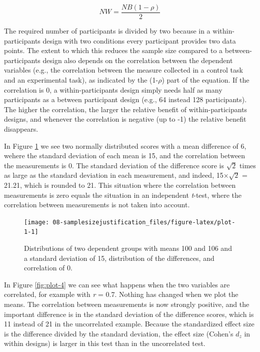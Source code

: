\documentclass[
  oneside]{book}
\begin{document}
\[NW = \frac{NB (1-\rho)}{2}\]

The required number of participants is divided by two because in a within-participants design with two conditions every participant provides two data points. The extent to which this reduces the sample size compared to a between-participants design also depends on the correlation between the dependent variables (e.g., the correlation between the measure collected in a control task and an experimental task), as indicated by the (1-\(\rho\)) part of the equation. If the correlation is 0, a within-participants design simply needs half as many participants as a between participant design (e.g., 64 instead 128 participants). The higher the correlation, the larger the relative benefit of within-participants designs, and whenever the correlation is negative (up to -1) the relative benefit disappears.

In Figure \ref{fig:plot-1} we see two normally distributed scores with a mean difference of 6, wehere the standard deviation of each mean is 15, and the correlation between the measurements is 0. The standard deviation of the difference score is \(\sqrt{2}\) times as large as the standard deviation in each measurement, and indeed, 15×\(\sqrt{2}\) = 21.21, which is rounded to 21. This situation where the correlation between measurements is zero equals the situation in an independent \emph{t}-test, where the correlation between measurements is not taken into account.

\begin{figure}

{\centering \texttt{[image: 08-samplesizejustification\_files/figure-latex/plot-1-1]} 

}

\caption{Distributions of two dependent groups with means 100 and 106 and a standard deviation of 15, distribution of the differences, and correlation of 0.}\label{fig:plot-1}
\end{figure}

In Figure \ref{fig:plot-4} we can see what happens when the two variables are correlated, for example with \emph{r} = 0.7. Nothing has changed when we plot the means. The correlation between measurements is now strongly positive, and the important difference is in the standard deviation of the difference scores, which is 11 instead of 21 in the uncorrelated example. Because the standardized effect size is the difference divided by the standard deviation, the effect size (Cohen's \(d_z\) in within designs) is larger in this test than in the uncorrelated test.
\end{document}
